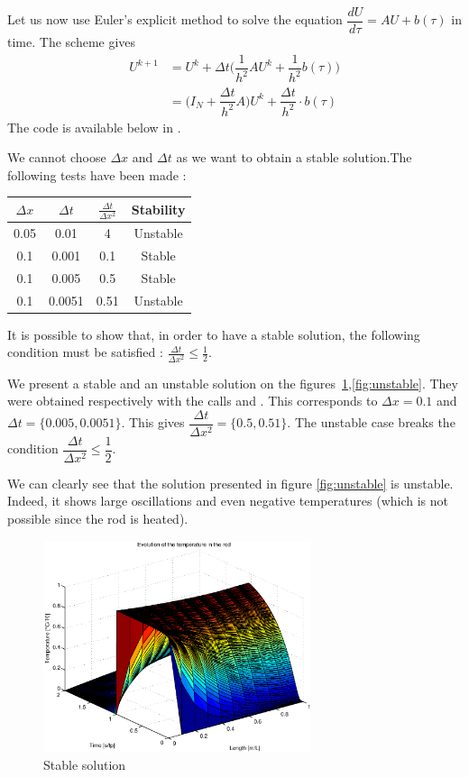 Let us now use Euler's explicit method to solve the equation $\dfrac{dU}{d \tau}= AU+b(\tau)$ in time. The scheme gives
\begin{align*}
U^{k+1} &= U^{k} + \Delta t\Big(\dfrac{1}{h^2}AU^{k}+\dfrac{1}{h^2}b(\tau)\Big)\\
 &= \Big( I_{N} + \dfrac{\Delta t}{h^2} A\Big)U^{k} + \dfrac{\Delta t}{h^2}\cdot b(\tau)
\end{align*}
The code is available below in .

We cannot choose $\Delta x$ and $\Delta t$ as we want to obtain a stable solution.The following tests have been made :

\begin{center}
\begin{tabular}{|c|c|c|c|}
\hline 
$\Delta x$ & $\Delta t$ &$\frac{\Delta t}{\Delta x^2}$ &\textbf{Stability} \\ 
\hline 
0.05 & 0.01 &4 &Unstable \\ 
\hline 
 0.1& 0.001 & 0.1 &Stable \\ 
\hline 
0.1 & 0.005 & 0.5 &Stable \\ 
\hline 
0.1 &0.0051 &0.51 &Unstable\\
\hline
\end{tabular} 
\end{center}

It is possible to show that, in order to have a stable solution, the following condition must be satisfied : $\frac{\Delta t}{\Delta x^2} \leq \frac{1}{2}$.

We present a stable and an unstable solution on the figures~\ref{fig:stable},\ref{fig:unstable}.
They were obtained respectively with the calls  and . This corresponds to $\Delta x = 0.1$ and $\Delta t = \{0.005, 0.0051 \}$. This gives $\dfrac{\Delta t}{\Delta x^2}= \{0.5,0.51\}$. The unstable case breaks the condition $\dfrac{\Delta t}{\Delta x^2}\leq \dfrac{1}{2}$.

We can clearly see that the solution presented in figure \ref{fig:unstable} is unstable. Indeed, it shows large oscillations and even negative temperatures (which is not possible since the rod is heated).

\begin{figure}[!h]
\centering
\includegraphics[width = 0.7\textwidth]{./stable.eps}
\caption{Stable solution }
\label{fig:stable}
\end{figure}

